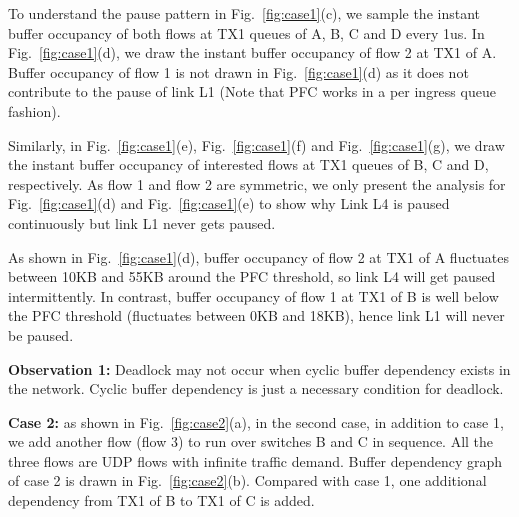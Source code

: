 To understand the pause pattern in Fig.~\ref{fig:case1}(c), we sample the instant buffer occupancy of both flows at TX1 queues of A, B, C and D every 1us. In Fig.~\ref{fig:case1}(d), we draw the instant buffer occupancy of flow 2 at TX1 of A. Buffer occupancy of flow 1 is not drawn in Fig.~\ref{fig:case1}(d) as it does not contribute to the pause of link L1 (Note that PFC works in a per ingress queue fashion). 

Similarly, in Fig.~\ref{fig:case1}(e), Fig.~\ref{fig:case1}(f) and Fig.~\ref{fig:case1}(g), we draw the instant buffer occupancy of interested flows at TX1 queues of B, C and D, respectively. As flow 1 and flow 2 are symmetric, we only present the analysis for Fig.~\ref{fig:case1}(d) and Fig.~\ref{fig:case1}(e) to show why Link L4 is paused continuously but link L1 never gets paused.

As shown in Fig.~\ref{fig:case1}(d), buffer occupancy of flow 2 at TX1 of A fluctuates between 10KB and 55KB around the PFC threshold, so link L4 will get paused intermittently. In contrast, buffer occupancy of flow 1 at TX1 of B is well below the PFC threshold (fluctuates between 0KB and 18KB), hence link L1 will never be paused.

%
%


\textbf{Observation 1:} Deadlock may not occur when cyclic buffer dependency exists in the network. Cyclic buffer dependency is just a necessary condition for deadlock.



\textbf{Case 2:} as shown in Fig.~\ref{fig:case2}(a), in the second case, in addition to case 1, we add another flow (flow 3) to run over switches B and C in sequence. All the three flows are UDP flows with infinite traffic demand. Buffer dependency graph of case 2 is drawn in Fig.~\ref{fig:case2}(b). Compared with case 1, one additional dependency from TX1 of B to TX1 of C is added.

